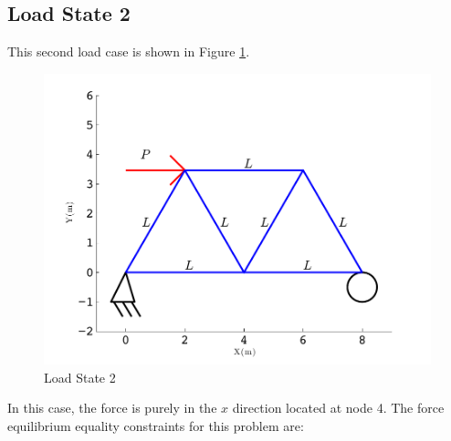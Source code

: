 \documentclass[12pt]{article}
\begin{document}
\subsection{Load State 2}
This second load case is shown in Figure \ref{fig:Load2}.
\begin{figure}[htb!]
	\begin{center}
		\includegraphics[width=1\textwidth]{TrussFS2}
	\end{center}
	\caption{Load State 2}
	\label{fig:Load2}
\end{figure}
In this case, the force is purely in the $x$ direction located at node 4.  The force equilibrium equality constraints for this problem are:
\end{document}
